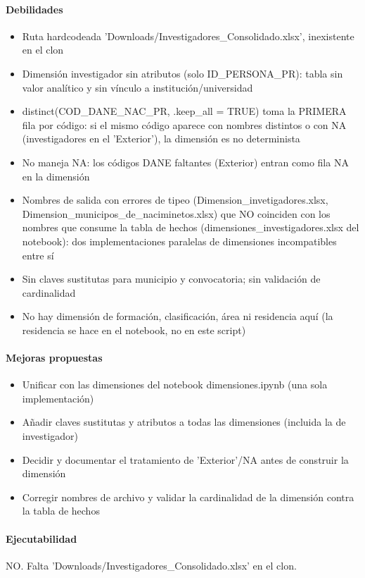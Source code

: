 \paragraph{Debilidades}
\begin{itemize}
  \item Ruta hardcodeada 'Downloads/Investigadores\_Consolidado.xlsx', inexistente en el clon
  \item Dimensión investigador sin atributos (solo ID\_PERSONA\_PR): tabla sin valor analítico y sin vínculo a institución/universidad
  \item distinct(COD\_DANE\_NAC\_PR, .keep\_all = TRUE) toma la PRIMERA fila por código: si el mismo código aparece con nombres distintos o con NA (investigadores en el 'Exterior'), la dimensión es no determinista
  \item No maneja NA: los códigos DANE faltantes (Exterior) entran como fila NA en la dimensión
  \item Nombres de salida con errores de tipeo (Dimension\_invetigadores.xlsx, Dimension\_municipos\_de\_naciminetos.xlsx) que NO coinciden con los nombres que consume la tabla de hechos (dimensiones\_investigadores.xlsx del notebook): dos implementaciones paralelas de dimensiones incompatibles entre sí
  \item Sin claves sustitutas para municipio y convocatoria; sin validación de cardinalidad
  \item No hay dimensión de formación, clasificación, área ni residencia aquí (la residencia se hace en el notebook, no en este script)
\end{itemize}

\paragraph{Mejoras propuestas}
\begin{itemize}
  \item Unificar con las dimensiones del notebook dimensiones.ipynb (una sola implementación)
  \item Añadir claves sustitutas y atributos a todas las dimensiones (incluida la de investigador)
  \item Decidir y documentar el tratamiento de 'Exterior'/NA antes de construir la dimensión
  \item Corregir nombres de archivo y validar la cardinalidad de la dimensión contra la tabla de hechos
\end{itemize}

\paragraph{Ejecutabilidad}
NO. Falta 'Downloads/Investigadores\_Consolidado.xlsx' en el clon.

